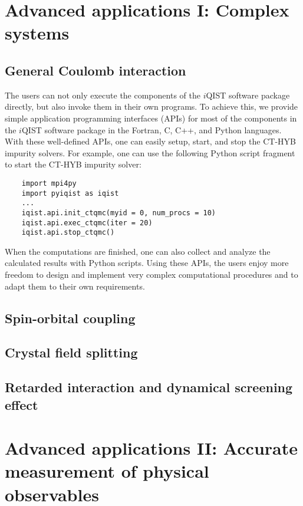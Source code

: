 \section{Advanced applications I: Complex systems}
\subsection{General Coulomb interaction}
The users can not only execute the components of the $i$QIST software package directly, but also invoke them in their own programs. To achieve this, we provide simple application programming interfaces (APIs) for most of the components in the $i$QIST software package in the Fortran, C, C++, and Python languages. With these well-defined APIs, one can easily setup, start, and stop the CT-HYB impurity solvers. For example, one can use the following Python script fragment to start the CT-HYB impurity solver:
\begin{verbatim}
    import mpi4py
    import pyiqist as iqist
    ...
    iqist.api.init_ctqmc(myid = 0, num_procs = 10)
    iqist.api.exec_ctqmc(iter = 20)
    iqist.api.stop_ctqmc()
\end{verbatim}
When the computations are finished, one can also collect and analyze the calculated results with Python scripts. Using these APIs, the users enjoy more freedom to design and implement very complex computational procedures and to adapt them to their own requirements.
\subsection{Spin-orbital coupling}
\subsection{Crystal field splitting}
\subsection{Retarded interaction and dynamical screening effect}

\section{Advanced applications II: Accurate measurement of physical observables}
